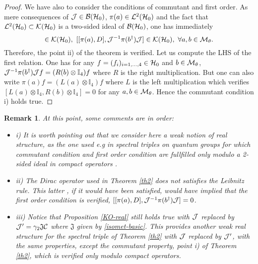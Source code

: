 \documentclass[a4paper,11pt,twoside]{article}
\numberwithin{equation}{section}
\newcommand\bbone{{ \mathbb{I}}}
\newtheorem{remark}[Theorem]{Remark}
\theoremstyle{nonumberplain}
\newtheorem{proof}{Proof}
\begin{document}
\begin{proof}
We have also to consider the conditions of commutant and first order. As mere consequences of ${\cal{J}}\in{\cal{B}}({\cal{H}}_0)$, $\pi(a)\in{\cal{L}}^2({\cal{H}}_0)$ and the fact that ${\cal{L}}^2({\cal{H}}_0)\subset{\cal{K}}({\cal{H}}_0)$ is a two-sided ideal of ${\cal{B}}({\cal{H}}_0)$, one has immediately
\begin{equation}
[\pi(a),{\cal{J}}^{-1}\pi(b^\dag){\cal{J}}]\in{\cal{K}}({\cal{H}}_0),\ [[\pi(a),D],{\cal{J}}^{-1}\pi(b^\dag){\cal{J}}]\in{\cal{K}}({\cal{H}}_0),\ \forall 
a,b\in{\cal{M}}_\theta.
\end{equation}
Therefore, the point ii) of the theorem is verified. Let us compute the LHS of the first relation. One has for any $f=(f_i)_{i=1,...,4}\in{\cal{H}}_0$ and $b\in{\cal{M}}_\theta$,  ${\cal{J}}^{-1}\pi(b^\dag){\cal{J}}f=(R(b)\otimes\bbone_4)f$ where $R$ is the right multiplication. But one can also write $\pi(a) f=(L(a)\otimes\bbone_4)f$ where $L$ is the left multiplication which verifies $[L(a)\otimes\bbone_4,R(b)\otimes\bbone_4]=0$ for any $a,b\in{\cal{M}}_\theta$. Hence the commutant condition i) holds true.
\end{proof}
\begin{remark}\label{weak-struc} At this point, some comments are in order:
\begin{itemize}
\vspace*{-4pt}
\setlength{\itemsep}{-1pt}
\item i) It is worth pointing out that we consider here a weak notion of real structure, as the one used e.g in spectral triples on quantum groups for which commutant condition and first order condition are fullfilled only modulo a 2-sided ideal in compact operators \cite{weak-real}.
\item ii) The Dirac operator used in Theorem \ref{th2} does not satisfies the Leibnitz rule. This latter , if it would have been satisfied, would have implied that the first order condition is verified, $[[\pi(a),D],{\cal{J}}^{-1}\pi(b^\dag){\cal{J}}]=0$.
\item iii) Notice that Proposition \ref{KO-real} still holds true with ${\cal{J}}$ replaced by ${\cal{J}}^\prime=\gamma_2\mathfrak{J}{\cal{C}} $ where $\mathfrak{J}$ given by \eqref{isomet-basic}. This provides another weak real structure for the spectral triple of 
Theorem \ref{th2} with ${\cal{J}}$ replaced by ${\cal{J}}^\prime$, with the same properties, except the commutant property, point i) of Theorem \ref{th2}, which is verified only modulo compact operators.
\end{itemize}
\end{remark}
\end{document}
